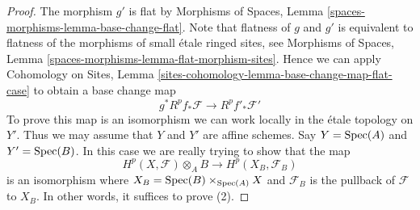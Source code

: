 \begin{proof}
The morphism $g'$ is flat by
Morphisms of Spaces, Lemma \ref{spaces-morphisms-lemma-base-change-flat}.
Note that flatness of $g$ and $g'$ is equivalent to flatness
of the morphisms of small \'etale ringed sites, see
Morphisms of Spaces, Lemma \ref{spaces-morphisms-lemma-flat-morphism-sites}.
Hence we can apply
Cohomology on Sites, Lemma
\ref{sites-cohomology-lemma-base-change-map-flat-case}
to obtain a base change map
$$
g^*R^pf_*\mathcal{F} \longrightarrow R^pf'_*\mathcal{F}'
$$
To prove this map is an isomorphism we can work locally in the \'etale
topology on $Y'$. Thus we may assume that $Y$ and $Y'$ are affine
schemes. Say $Y = \mathop{\mathrm{Spec}}(A)$ and $Y' = \mathop{\mathrm{Spec}}(B)$.
In this case we are really trying to show that the map
$$
H^p(X, \mathcal{F}) \otimes_A B \longrightarrow H^p(X_B, \mathcal{F}_B)
$$
is an isomorphism where $X_B = \mathop{\mathrm{Spec}}(B) \times_{\mathop{\mathrm{Spec}}(A)} X$ and
$\mathcal{F}_B$ is the pullback of $\mathcal{F}$ to $X_B$.
In other words, it suffices to prove (2).


\end{proof}
